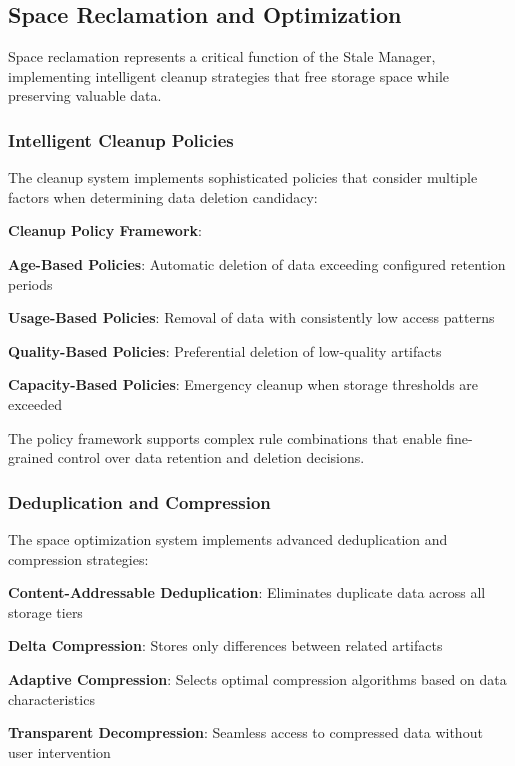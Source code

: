 \subsection*{Space Reclamation and Optimization}

Space reclamation represents a critical function of the Stale Manager, implementing intelligent cleanup strategies that free storage space while preserving valuable data.

\subsubsection*{Intelligent Cleanup Policies}

The cleanup system implements sophisticated policies that consider multiple factors when determining data deletion candidacy:

\begin{successbox}
\textbf{Cleanup Policy Framework}:
\begin{compactlist}
    \item \textbf{Age-Based Policies}: Automatic deletion of data exceeding configured retention periods
    \item \textbf{Usage-Based Policies}: Removal of data with consistently low access patterns
    \item \textbf{Quality-Based Policies}: Preferential deletion of low-quality artifacts
    \item \textbf{Capacity-Based Policies}: Emergency cleanup when storage thresholds are exceeded
\end{compactlist}
\end{successbox}

The policy framework supports complex rule combinations that enable fine-grained control over data retention and deletion decisions.

\subsubsection*{Deduplication and Compression}

The space optimization system implements advanced deduplication and compression strategies:

\begin{expandedlist}
    \item \textbf{Content-Addressable Deduplication}: Eliminates duplicate data across all storage tiers
    \item \textbf{Delta Compression}: Stores only differences between related artifacts
    \item \textbf{Adaptive Compression}: Selects optimal compression algorithms based on data characteristics
    \item \textbf{Transparent Decompression}: Seamless access to compressed data without user intervention
\end{expandedlist}

